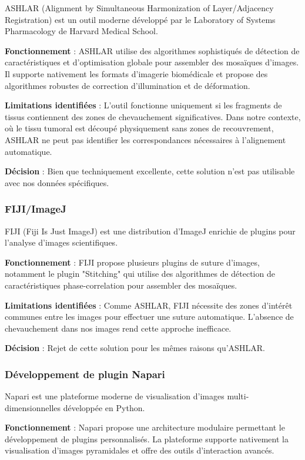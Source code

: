 \documentclass[12pt,a4paper]{report}
\begin{document}
ASHLAR (Alignment by Simultaneous Harmonization of Layer/Adjacency Registration) est un outil moderne développé par le Laboratory of Systems Pharmacology de Harvard Medical School.

\textbf{Fonctionnement} : ASHLAR utilise des algorithmes sophistiqués de détection de caractéristiques et d'optimisation globale pour assembler des mosaïques d'images. Il supporte nativement les formats d'imagerie biomédicale et propose des algorithmes robustes de correction d'illumination et de déformation.

\textbf{Limitations identifiées} : L'outil fonctionne uniquement si les fragments de tissus contiennent des zones de chevauchement significatives. Dans notre contexte, où le tissu tumoral est découpé physiquement sans zones de recouvrement, ASHLAR ne peut pas identifier les correspondances nécessaires à l'alignement automatique.

\textbf{Décision} : Bien que techniquement excellente, cette solution n'est pas utilisable avec nos données spécifiques.

\subsubsection{FIJI/ImageJ}

FIJI (Fiji Is Just ImageJ) est une distribution d'ImageJ enrichie de plugins pour l'analyse d'images scientifiques.

\textbf{Fonctionnement} : FIJI propose plusieurs plugins de suture d'images, notamment le plugin "Stitching" qui utilise des algorithmes de détection de caractéristiques phase-correlation pour assembler des mosaïques.

\textbf{Limitations identifiées} : Comme ASHLAR, FIJI nécessite des zones d'intérêt communes entre les images pour effectuer une suture automatique. L'absence de chevauchement dans nos images rend cette approche inefficace.

\textbf{Décision} : Rejet de cette solution pour les mêmes raisons qu'ASHLAR.

\subsubsection{Développement de plugin Napari}

Napari est une plateforme moderne de visualisation d'images multi-dimensionnelles développée en Python.

\textbf{Fonctionnement} : Napari propose une architecture modulaire permettant le développement de plugins personnalisés. La plateforme supporte nativement la visualisation d'images pyramidales et offre des outils d'interaction avancés.
\end{document}
